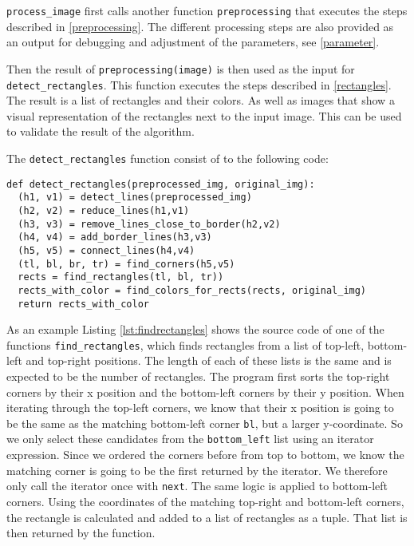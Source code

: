 \texttt{process\_image} first calls another function \texttt{preprocessing} that
executes the steps described in \ref{preprocessing}. The different processing
steps are also provided as an output for debugging and adjustment of the
parameters, see \ref{parameter}.


Then the result of \texttt{preprocessing(image)} is then used as the input for
\texttt{detect\_rectangles}. This function executes the steps described in
\ref{rectangles}. The result is a list of rectangles and their colors. As
well as images that show a visual representation of the rectangles next to
the input image. This can be used to validate the result of the algorithm.

The \texttt{detect\_rectangles} function consist of to the following code:

\begin{lstlisting}
def detect_rectangles(preprocessed_img, original_img):
  (h1, v1) = detect_lines(preprocessed_img)
  (h2, v2) = reduce_lines(h1,v1)
  (h3, v3) = remove_lines_close_to_border(h2,v2)
  (h4, v4) = add_border_lines(h3,v3)
  (h5, v5) = connect_lines(h4,v4)
  (tl, bl, br, tr) = find_corners(h5,v5)
  rects = find_rectangles(tl, bl, tr))
  rects_with_color = find_colors_for_rects(rects, original_img)
  return rects_with_color
\end{lstlisting}

As an example Listing \ref{lst:findrectangles} shows the source code of
one of the functions \texttt{find\_rectangles}, which finds rectangles from a
list of top-left, bottom-left and top-right positions. The length of each of
these lists is the same and is expected to be the number of rectangles. The
program first sorts the top-right corners by their x position and the
bottom-left corners by their y position. When iterating through the top-left
corners, we know that their x position is going to be the same as the matching
bottom-left corner \texttt{bl}, but a larger y-coordinate. So we only select
these candidates from the \texttt{bottom\_left} list using an iterator
expression. Since we ordered the corners before from top to bottom, we know the
matching corner is going to be the first returned by the iterator. We therefore
only call the iterator once with \texttt{next}. The same logic is applied to
bottom-left corners. Using the coordinates of the matching top-right and
bottom-left corners, the rectangle is calculated and added to a list of
rectangles as a tuple. That list is then returned by the function.

